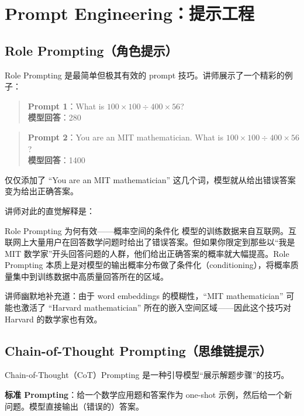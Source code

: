 \section{Prompt Engineering：提示工程}

\subsection{Role Prompting（角色提示）}

Role Prompting 是最简单但极其有效的 prompt 技巧。讲师展示了一个精彩的例子：

\begin{quote}
\textbf{Prompt 1}：What is $100 \times 100 \div 400 \times 56$? \\
\textbf{模型回答}：280 
\end{quote}

\begin{quote}
\textbf{Prompt 2}：You are an MIT mathematician. What is $100 \times 100 \div 400 \times 56$? \\
\textbf{模型回答}：1400 
\end{quote}

仅仅添加了 ``You are an MIT mathematician'' 这几个词，模型就从给出错误答案变为给出正确答案。

讲师对此的直觉解释是：

\begin{importantbox}{Role Prompting 为何有效——概率空间的条件化}
模型的训练数据来自互联网。互联网上大量用户在回答数学问题时给出了错误答案。但如果你限定到那些以``我是 MIT 数学家''开头回答问题的人群，他们给出正确答案的概率就大幅提高。Role Prompting 本质上是对模型的输出概率分布做了条件化（conditioning），将概率质量集中到训练数据中高质量回答所在的区域。
\end{importantbox}

讲师幽默地补充道：由于 word embeddings 的模糊性，``MIT mathematician'' 可能也激活了 ``Harvard mathematician'' 所在的嵌入空间区域——因此这个技巧对 Harvard 的数学家也有效。

\subsection{Chain-of-Thought Prompting（思维链提示）}

Chain-of-Thought（CoT）Prompting 是一种引导模型``展示解题步骤''的技巧。

\textbf{标准 Prompting}：给一个数学应用题和答案作为 one-shot 示例，然后给一个新问题。模型直接输出（错误的）答案。

